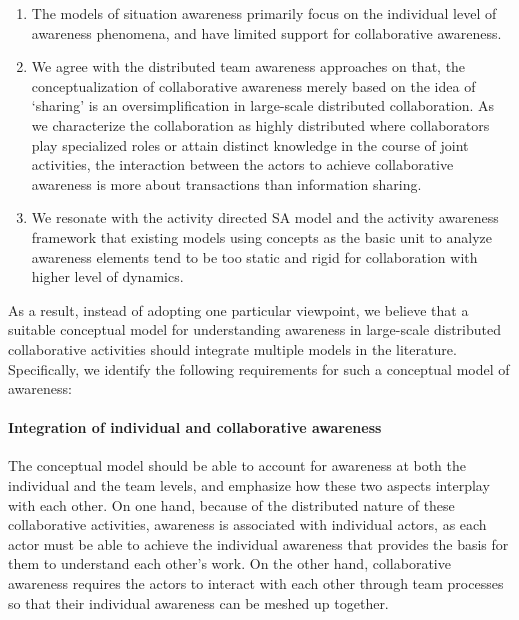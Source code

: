\begin{enumerate}
   \item The models of situation awareness primarily focus on the individual level of awareness phenomena, and have limited support for collaborative awareness. 
   \item We agree with the distributed team awareness approaches \cite{Salmon2010} on that, the conceptualization of collaborative awareness merely based on the idea of `sharing' is an oversimplification in large-scale distributed collaboration. As we characterize the collaboration as highly distributed where collaborators play specialized roles or attain distinct knowledge in the course of joint activities, the interaction between the actors to achieve collaborative awareness is more about transactions than information sharing.
   \item We resonate with the activity directed SA model \cite{Bedny1999} and the activity awareness framework \cite{carroll2003a} that existing models using concepts as the basic unit to analyze awareness elements tend to be too static and rigid for collaboration with higher level of dynamics.
\end{enumerate}

As a result, instead of adopting one particular viewpoint, we believe that a suitable conceptual model for understanding awareness in large-scale distributed collaborative activities should integrate multiple models in the literature. Specifically, we identify the following requirements for such a conceptual model of awareness:

\paragraph*{Integration of individual and collaborative awareness} %
\label{par:the_integration_of_individual_and_collaborative_awareness}
The conceptual model should be able to account for awareness at both the individual and the team levels, and emphasize how these two aspects interplay with each other. On one hand, because of the distributed nature of these collaborative activities, awareness is associated with individual actors, as each actor must be able to achieve the individual awareness that provides the basis for them to understand each other's work. On the other hand, collaborative awareness requires the actors to interact with each other through team processes so that their individual awareness can be meshed up together.

